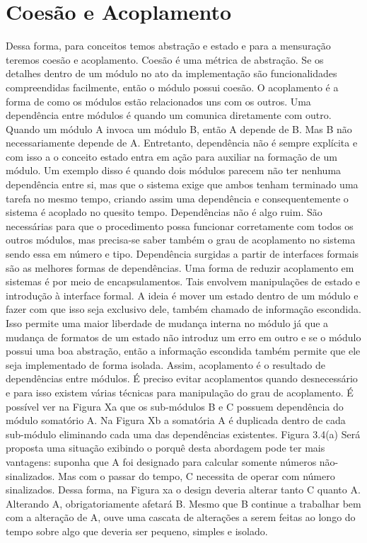\section{Coesão e Acoplamento}
Dessa forma, para conceitos temos abstração e estado e para a mensuração teremos coesão e acoplamento. Coesão é uma métrica de abstração. Se os detalhes dentro de um módulo no ato da implementação são funcionalidades compreendidas facilmente, então o módulo possui coesão. O acoplamento é a forma de como os módulos estão relacionados uns com os outros. Uma dependência entre módulos é quando um comunica diretamente com outro. Quando um módulo A invoca um módulo B, então A depende de B. Mas B não necessariamente depende de A. Entretanto, dependência não é sempre explícita e com isso a o conceito estado entra em ação para auxiliar na formação de um módulo. Um exemplo disso é quando dois módulos parecem não ter nenhuma dependência entre si, mas que o sistema exige que ambos tenham terminado uma tarefa no mesmo tempo, criando assim uma dependência e consequentemente o sistema é acoplado no quesito tempo. Dependências não é algo ruim. São necessárias para que o procedimento possa funcionar corretamente com todos os outros módulos, mas precisa-se saber também o grau de acoplamento no sistema sendo essa em número e tipo. Dependência surgidas a partir de interfaces formais são as melhores formas de dependências. Uma forma de reduzir acoplamento em sistemas é por meio de encapsulamentos. Tais envolvem manipulações de estado e introdução à interface formal. A ideia é mover um estado dentro de um módulo e fazer com que isso seja exclusivo dele, também chamado de informação escondida. Isso permite uma maior liberdade de mudança interna no módulo já que a mudança de formatos de um estado não introduz um erro em outro e se o módulo possui uma boa abstração, então a informação escondida também permite que ele seja implementado de forma isolada. Assim, acoplamento é o resultado de dependências entre módulos. 
É preciso evitar acoplamentos quando desnecessário e para isso existem várias técnicas para manipulação do grau de acoplamento.
É possível ver na Figura Xa que os sub-módulos B e C possuem dependência do módulo somatório A. Na Figura Xb a somatória A é duplicada dentro de cada sub-módulo eliminando cada uma das dependências existentes.
Figura 3.4(a)
Será proposta uma situação exibindo o porquê desta abordagem pode ter mais vantagens: suponha que A foi designado para calcular somente números não-sinalizados. Mas com o passar do tempo, C necessita de operar com número sinalizados. Dessa forma, na Figura xa o design deveria alterar tanto C quanto A. Alterando A, obrigatoriamente afetará B. Mesmo que B continue a trabalhar bem com a alteração de A, ouve uma cascata de alterações a serem feitas ao longo do tempo sobre algo que deveria ser pequeno, simples e isolado. 
